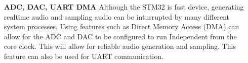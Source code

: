 \documentclass{article}[12pt,a4paper]
\begin{document}
\begin{itemize}
  \item[\textbf{ADC, DAC, UART DMA}]
  Although the STM32 is fast device, generating realtime audio and sampling audio can be inturrupted by many different system processes. Using features such as Direct Memory Access (DMA) can allow for the ADC and DAC to be configured to run Independent from the core clock. This will allow for reliable audio generation and sampling. This feature can also be used for UART communication. 

\end{itemize}



\end{document}
